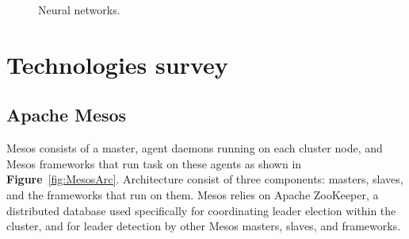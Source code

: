 \documentclass[12pt,oneside,openright,a4paper]{cpe-english-project}
\begin{document}
\begin{figure}[!h]\centering
  \setlength{\fboxrule}{0mm} %
  \setlength{\fboxsep}{0cm}
  \caption{Neural networks.}\label{fig:NN}
\end{figure}

\newpage

\section{Technologies survey}  

\subsection{Apache Mesos}
\hspace{10mm}Mesos consists of a master, agent daemons running on each cluster node, and Mesos frameworks that run task on these agents as shown in \textbf{Figure}~\ref{fig:MesosArc}. Architecture consist of three components: masters, slaves, and the frameworks that run on them. Mesos relies on Apache ZooKeeper, a distributed database used specifically for coordinating leader election within the cluster, and for leader detection by other Mesos masters, slaves, and frameworks. \cite{mesosInAction}
\end{document}
